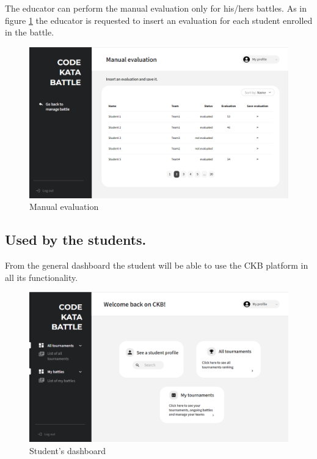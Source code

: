 The educator can perform the manual evaluation only for his/hers battles. As in figure \ref{fig:evalM} the educator is requested to insert an evaluation for each student enrolled in the battle.
\begin{figure}[h]
    \centering
    \includegraphics[width=\textwidth]{images/mockups/educators/evalM.png}
    \caption{Manual evaluation}
    \label{fig:evalM}
\end{figure}

\clearpage
\subsection*{Used by the students.}
From the general dashboard the student will be able to use the CKB platform in all its functionality. 
\begin{figure}[h]
    \centering
    \includegraphics[width=\textwidth]{images/mockups/students/Sdashboard.png}
    \caption{Student's dashboard}
    \label{fig:Sdash}
\end{figure}

